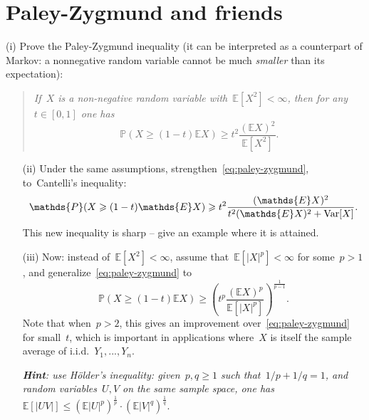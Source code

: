 \documentclass[11pt]{article}
\newcommand{\E}{\mathds{E}}
\newcommand{\Prob}{\mathds{P}}
\newcommand{\Var}{\textup{Var}}
\newcommand{\leqs}{\leqslant}
\newcommand{\geqs}{\geqslant}
\renewcommand{\le}{\leqs}
\renewcommand{\ge}{\geqs}
\begin{document}
\newpage
\noindent

\section{Paley-Zygmund and friends} 

(i) Prove the Paley-Zygmund inequality (it can be interpreted as a counterpart of Markov: a nonnegative random variable cannot be much {\em smaller} than its expectation):
\begin{quote}
{\em 
\vspace{-0.1cm}
If~$X$ is a non-negative random variable with~$\E[X^2] < \infty$, then for any~$t \in [0,1]$ one has 
\begin{equation}
\label{eq:paley-zygmund}
\Prob(X \ge (1-t)\E X) \ge t^2 \frac{(\E X)^2}{\E[X^2]}.
\end{equation}
}
\end{quote}
\begin{itemize}
\item[(ii)] Under the same assumptions, strengthen~\eqref{eq:paley-zygmund}, to~Cantelli's inequality:
\[
\Prob(X \ge (1-t)\E X) \ge t^2 \frac{(\E X)^2}{t^2 (\E X)^2 + \Var[X]}.
\]
This new inequality is sharp -- give an example where it is attained. 

\item[(iii)] 
Now: instead of~$\E[X^2] < \infty$, assume that~$\E[|X|^p] < \infty$ for some~$p > 1$, and generalize~\eqref{eq:paley-zygmund} to
\[
\Prob(X \ge (1-t)\E X) \ge \left(t^{p} \frac{(\E X)^{p}}{\E[|X|^p]}\right)^{\frac{1}{p-1}}.
\]
Note that when~$p > 2$, this gives an improvement over~\eqref{eq:paley-zygmund} for small~$t$, which is important in applications where~$X$ is itself the sample average of i.i.d.~$Y_1,...,Y_n$.

\em{{\bf Hint}: use H\"older's inequality:
given~$p,q \ge 1$ such that~$1/p + 1/q = 1$, and random variables~$U,V$ on the same sample space, one has
$
\E[|UV|] \le (\E |U|^p)^{\frac{1}{p}} \cdot (\E |V|^q)^{\frac{1}{q}}.
$
}
\end{itemize}
\end{document}
